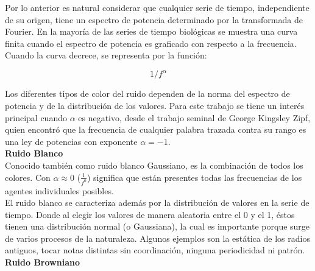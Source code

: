 \documentclass[letterpaper,titlepage,12pt,draft]{report}
\begin{document}
Por lo anterior es natural considerar que cualquier serie de tiempo, independiente de su origen, tiene un espectro de potencia determinado por la transformada de Fourier. En la mayor\'ia de las series de tiempo biol\'ogicas se muestra una curva finita cuando el espectro de potencia es graficado con respecto a la frecuencia. Cuando la curva decrece, se representa por la funci\'on: 

\begin{equation}
1/f^{\alpha}
\label{potencia}
\end{equation}

Los diferentes tipos de color del ruido dependen de la norma del espectro de potencia y de la distribuci\'on de los valores. Para este trabajo se tiene un inter\'es principal cuando $\alpha$ es negativo, desde el trabajo seminal de George Kingsley Zipf, quien encontr\'o que la frecuencia de cualquier palabra trazada contra su rango es una ley de potencias con exponente $\alpha=-1$.\\


{\bf Ruido Blanco}\\

Conocido tambi\'en como ruido blanco Gaussiano, es la combinaci\'on de todos los colores. Con $\alpha\approx0$ ($\frac{1}{f^0}$) significa que est\'an presentes todas las frecuencias de los agentes individuales posibles. \\

El ruido blanco se caracteriza adem\'as por la distribuci\'on de valores en la serie de tiempo. Donde al elegir los valores de manera aleatoria entre el 0 y el 1, \'estos tienen una distribuci\'on normal (o Gaussiana), la cual es importante  porque surge de varios procesos de la naturaleza. Algunos ejemplos son la est\'atica de los radios antiguos, tocar notas distintas sin coordinaci\'on, ninguna periodicidad ni patr\'on.\\

%
%
%
%
%

{\bf Ruido Browniano}\\
\end{document}
